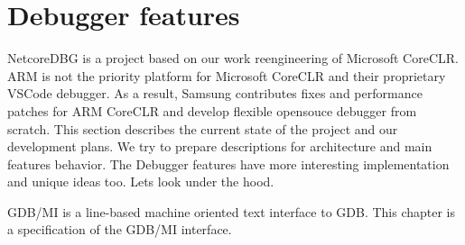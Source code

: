 \documentclass[a4paper,12pt]{article}
\begin{document}
\newpage
\section{Debugger features}\label{sec:features}
NetcoreDBG is a project based on our work reengineering of Microsoft CoreCLR. ARM is not the priority platform for Microsoft CoreCLR and their proprietary VSCode debugger. As a result, Samsung contributes fixes and performance patches for ARM CoreCLR and develop flexible opensouce debugger from scratch. This section describes the current state of the project and our development plans. We try to prepare descriptions for architecture and main features behavior. The Debugger features have more interesting implementation and unique ideas too. Lets look under the hood.

GDB/MI is a line-based machine oriented text interface to GDB. This chapter is a specification of the GDB/MI interface.
\end{document}
